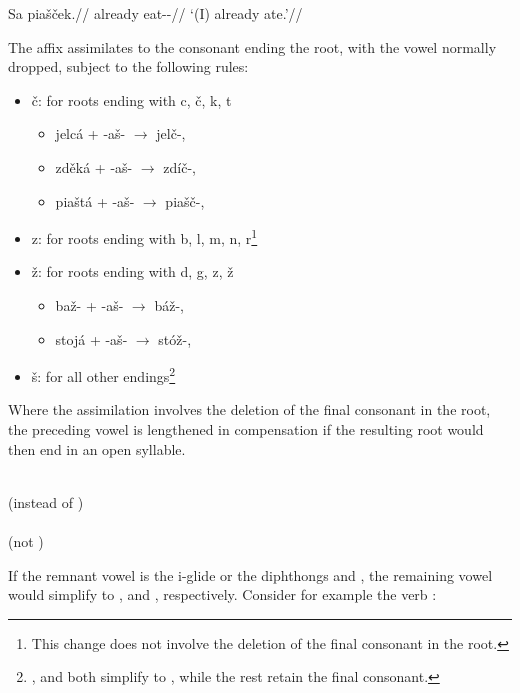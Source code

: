 \pex
\begingl
\gla Sa piašček.//
\glb already eat-\Av{}-\Pf{}//
\glft `(I) already ate.'//
\endgl
\xe

The affix  assimilates to the consonant ending the root, with the vowel  normally dropped, subject to the following rules:
\begin{itemize}
	\item č: for roots ending with c, č, k, t
	\begin{itemize}
		\item jelcá + -aš- $\rightarrow$ jelč-, 
		\item zděká + -aš- $\rightarrow$ zdíč-, 
		\item piaštá + -aš- $\rightarrow$ piašč-, 
	\end{itemize}
	\item z: for roots ending with b, l, m, n, r\footnote{This change does not involve the deletion of the final consonant in the root.}
	\item ž: for roots ending with d, g, z, ž
	\begin{itemize}
		\item baž- + -aš- $\rightarrow$ báž-, 
		\item stojá + -aš- $\rightarrow$ stóž-, 
	\end{itemize}
	\item š: for all other endings\footnote{ ,  and  both simplify to , while the rest retain the final consonant.}
\end{itemize}

Where the assimilation involves the deletion of the final consonant in the root, the preceding vowel is lengthened in compensation if the resulting root would then end in an open syllable.
\begin{multicols}{2}
\pex
{}\\
(instead of )\\
\xe
\pex
{}\\
(not )\\
\xe
\end{multicols}

If the remnant vowel is the i-glide  or the diphthongs  and , the remaining vowel would simplify to ,  and , respectively. Consider for example the verb  :

